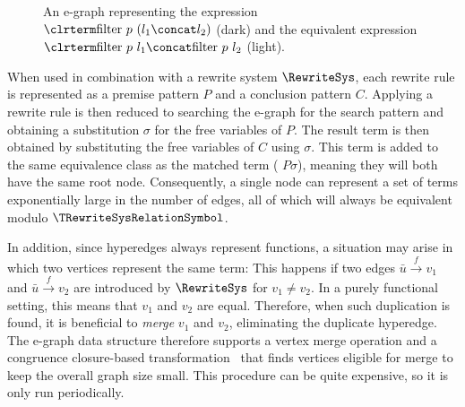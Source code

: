\begin{SCfigure}[1.18][t]
\scalebox{.9}{

}
\caption{An e-graph representing the expression
$\clrterm\textrm{filter}~p~(l_1 \concat l_2)$ (dark)
and the equivalent expression
$\clrterm\textrm{filter}~p~l_1 \concat \textrm{filter}~p~l_2$ (light).}
\label{prelim:peg}
\end{SCfigure}

When used in combination with a rewrite system $\RewriteSys$, each
rewrite rule is represented as a premise pattern $P$ and a conclusion pattern $C$.
Applying a rewrite rule is then reduced to searching the e-graph for the search pattern and obtaining a substitution $\sigma$ for the free variables of $P$.
The result term is then obtained by substituting the free variables of $C$ using $\sigma$.
This term is added to the same equivalence class as the matched term (\ie{} $P\sigma$), meaning they will both have the same root node.
Consequently, a single node can represent a set of terms
exponentially large in the number of edges, all of which will always be equivalent modulo 
$\TRewriteSysRelationSymbol$.


In addition, since hyperedges always represent functions, a situation may arise
in which two vertices represent the same term:
This happens if two edges $\bar{u}\xrightarrow{\scriptscriptstyle f}v_1$ and $\bar{u}\xrightarrow{\scriptscriptstyle f}v_2$
are introduced by $\RewriteSys$ for $v_1\neq v_2$.
In a purely functional setting, this means that $v_1$ and $v_2$ are equal.
Therefore, when such duplication is found,
it is beneficial to \emph{merge} $v_1$ and $v_2$, eliminating the duplicate hyperedge.
The e-graph data structure therefore supports a vertex merge operation and a congruence closure-based
transformation~\cite{egg}
that finds vertices eligible for merge to keep the overall graph size small.
This procedure can be quite expensive, so it is only run periodically.